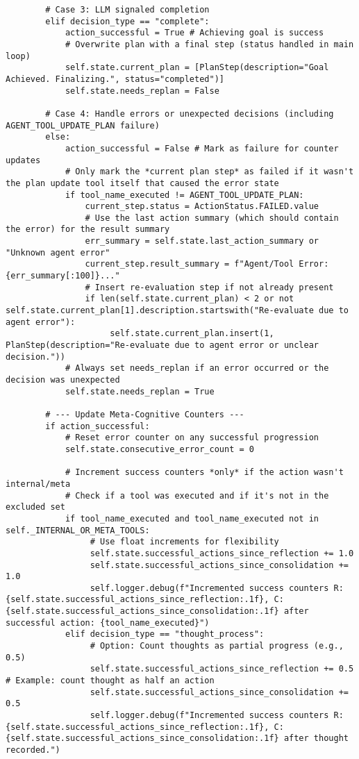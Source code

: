 \documentclass[12pt,a4paper]{article}
\begin{document}
\begin{pageablecode}
\begin{verbatim}
        # Case 3: LLM signaled completion
        elif decision_type == "complete":
            action_successful = True # Achieving goal is success
            # Overwrite plan with a final step (status handled in main loop)
            self.state.current_plan = [PlanStep(description="Goal Achieved. Finalizing.", status="completed")]
            self.state.needs_replan = False

        # Case 4: Handle errors or unexpected decisions (including AGENT_TOOL_UPDATE_PLAN failure)
        else:
            action_successful = False # Mark as failure for counter updates
            # Only mark the *current plan step* as failed if it wasn't the plan update tool itself that caused the error state
            if tool_name_executed != AGENT_TOOL_UPDATE_PLAN:
                current_step.status = ActionStatus.FAILED.value
                # Use the last action summary (which should contain the error) for the result summary
                err_summary = self.state.last_action_summary or "Unknown agent error"
                current_step.result_summary = f"Agent/Tool Error: {err_summary[:100]}..."
                # Insert re-evaluation step if not already present
                if len(self.state.current_plan) < 2 or not self.state.current_plan[1].description.startswith("Re-evaluate due to agent error"):
                     self.state.current_plan.insert(1, PlanStep(description="Re-evaluate due to agent error or unclear decision."))
            # Always set needs_replan if an error occurred or the decision was unexpected
            self.state.needs_replan = True

        # --- Update Meta-Cognitive Counters ---
        if action_successful:
            # Reset error counter on any successful progression
            self.state.consecutive_error_count = 0

            # Increment success counters *only* if the action wasn't internal/meta
            # Check if a tool was executed and if it's not in the excluded set
            if tool_name_executed and tool_name_executed not in self._INTERNAL_OR_META_TOOLS:
                 # Use float increments for flexibility
                 self.state.successful_actions_since_reflection += 1.0
                 self.state.successful_actions_since_consolidation += 1.0
                 self.logger.debug(f"Incremented success counters R:{self.state.successful_actions_since_reflection:.1f}, C:{self.state.successful_actions_since_consolidation:.1f} after successful action: {tool_name_executed}")
            elif decision_type == "thought_process":
                 # Option: Count thoughts as partial progress (e.g., 0.5)
                 self.state.successful_actions_since_reflection += 0.5 # Example: count thought as half an action
                 self.state.successful_actions_since_consolidation += 0.5
                 self.logger.debug(f"Incremented success counters R:{self.state.successful_actions_since_reflection:.1f}, C:{self.state.successful_actions_since_consolidation:.1f} after thought recorded.")


\end{verbatim}
\end{pageablecode}
\end{document}
